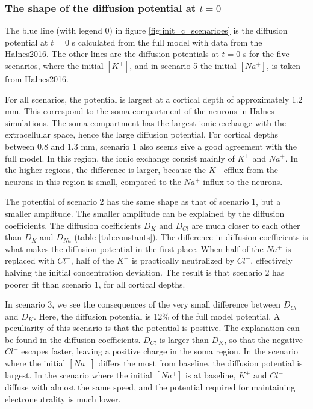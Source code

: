 \documentclass{article}
\begin{document}
\subsubsection{The shape of the diffusion potential at $t=0$}

The blue line (with legend 0) in figure \ref{fig:init_c_scenarioes} is the diffusion potential at $t=0$ s calculated from the full model with data from the Halnes2016. The other lines are the diffusion potentials at $t=0$ s for the five scenarios, where the initial $[K^+]$, and in scenario 5 the initial $[Na^+]$, is taken from Halnes2016.  

For all scenarios, the potential is largest at a cortical depth of approximately 1.2 mm. This correspond to the soma compartment of the neurons in Halnes simulations. The soma compartment has the largest ionic exchange with the extracellular space, hence the large diffusion potential. For cortical depths between 0.8 and 1.3 mm, scenario 1 also seems give a good agreement with the full model. In this region, the ionic exchange consist mainly of $K^+$ and $Na^+$. In the higher regions, the difference is larger, because the $K^+$ efflux from the neurons in this region is small, compared to the $Na^+$ influx to the neurons.

The potential of scenario 2 has the same shape as that of scenario 1, but a smaller amplitude. The smaller amplitude can be explained by the diffusion coefficients. The diffusion coefficients $D_K$ and $D_{Cl}$ are much closer to each other than $D_K$ and $D_{Na}$ (table \ref{tab:constants}).  The difference in diffusion coefficients is what makes the diffusion potential in the first place. When half of the $Na^+ $ is replaced with $Cl^-$, half of the $K^+$ is practically neutralized by $Cl^-$, effectively halving the initial concentration deviation. The result is that scenario 2 has poorer fit than scenario 1, for all cortical depths. 

In scenario 3, we see the consequences of the very small difference between $D_{Cl}$ and $D_K$. Here, the diffusion potential is 12\% of the full model potential. A peculiarity of this scenario is that the potential is positive. The explanation can be found in the diffusion coefficients. $D_{Cl}$ is larger than $D_K$, so that the negative $Cl^-$ escapes faster, leaving a positive charge in the soma region. In the scenario where the initial $[Na^+]$ differs the most from baseline, the diffusion potential is largest. In the scenario where the initial $[Na^+]$ is at baseline, $K^+$ and $Cl^-$ diffuse with almost the same speed, and the potential required for maintaining electroneutrality is much lower. 
\end{document}
